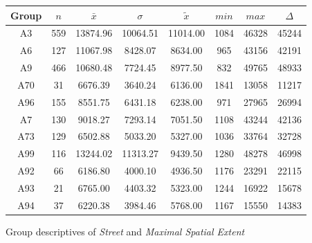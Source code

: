 \begin{figure}[ht!]
	\centering
	\begin{minipage}{0.5\textwidth}
		\tiny
		\setlength{\tabcolsep}{4pt}
		\centering
		\begin{tabular}{c|c|c|c|c|c|c|c}
			\toprule
			Group & $n$ & $\bar{x}$ & $\sigma$ & $\tilde{x}$ & $min$ & $max$ & $\Delta$ \\
			\midrule
			A3  & 559 & 13874.96 & 10064.51 & 11014.00 & 1084 & 46328 & 45244 \\ 
			A6  & 127 & 11067.98 & 8428.07  & 8634.00  & 965  & 43156 & 42191 \\ 
			A9  & 466 & 10680.48 & 7724.45  & 8977.50  & 832  & 49765 & 48933 \\ 
			A70 & 31  & 6676.39  & 3640.24  & 6136.00  & 1841 & 13058 & 11217 \\ 
			A96 & 155 & 8551.75  & 6431.18  & 6238.00  & 971  & 27965 & 26994 \\ 
			A7  & 130 & 9018.27  & 7293.14  & 7051.50  & 1108 & 43244 & 42136 \\ 
			A73 & 129 & 6502.88  & 5033.20  & 5327.00  & 1036 & 33764 & 32728 \\ 
			A99 & 116 & 13244.02 & 11313.27 & 9439.50  & 1280 & 48278 & 46998 \\ 
			A92 & 66  & 6186.80  & 4000.10  & 4936.50  & 1176 & 23291 & 22115 \\ 
			A93 & 21  & 6765.00  & 4403.32  & 5323.00  & 1244 & 16922 & 15678 \\ 
			A94 & 37  & 6220.38  & 3984.46  & 5768.00  & 1167 & 15550 & 14383 \\ 
			\bottomrule
		\end{tabular}
		\label{tbl:descriptives_baysis_matched_Str_SMax}
	\end{minipage}%
	\begin{minipage}{0.55\textwidth}
		\tiny
		\centering
		\vfill
		\label{fig:descriptives_baysis_matched_Str_SMax}
	\end{minipage}%
	\caption{Group descriptives of \textit{Street} and \textit{Maximal Spatial Extent}}
\end{figure}
